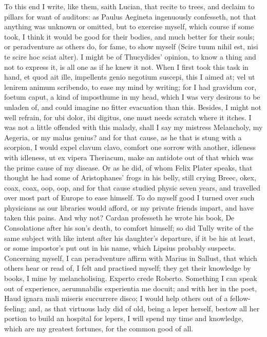{To this end I write, like them, saith Lucian, that recite to trees, and
declaim to pillars for want of auditors: as Paulus Aegineta
ingenuously confesseth, not that anything was unknown or omitted, but
to exercise myself, which course if some took, I think it would be good
for their bodies, and much better for their souls; or peradventure as
others do, for fame, to show myself (Scire tuum nihil est, nisi te
scire hoc sciat alter). I might be of Thucydides' opinion, to know
a thing and not to express it, is all one as if he knew it not. When I
first took this task in hand, et quod ait ille, impellents genio
negotium suscepi, this I aimed at; vel ut lenirem animum scribendo,
to ease my mind by writing; for I had gravidum cor, foetum caput, a
kind of imposthume in my head, which I was very desirous to be unladen
of, and could imagine no fitter evacuation than this. Besides, I might
not well refrain, for ubi dolor, ibi digitus, one must needs scratch
where it itches. I was not a little offended with this malady, shall I
say my mistress Melancholy, my Aegeria, or my malus genius? and for
that cause, as he that is stung with a scorpion, I would expel clavum
clavo, comfort one sorrow with another, idleness with idleness, ut
ex vipera Theriacum, make an antidote out of that which was the prime
cause of my disease. Or as he did, of whom Felix Plater speaks,
that thought he had some of Aristophanes' frogs in his belly, still
crying Breec, okex, coax, coax, oop, oop, and for that cause studied
physic seven years, and travelled over most part of Europe to ease
himself. To do myself good I turned over such physicians as our
libraries would afford, or my private friends impart, and have
taken this pains. And why not? Cardan professeth he wrote his book, De
Consolatione after his son's death, to comfort himself; so did Tully
write of the same subject with like intent after his daughter's
departure, if it be his at least, or some impostor's put out in his
name, which Lipsius probably suspects. Concerning myself, I can
peradventure affirm with Marius in Sallust, that which others hear
or read of, I felt and practised myself; they get their knowledge by
books, I mine by melancholising. Experto crede Roberto. Something I can
speak out of experience, aerumnabilis experientia me docuit; and with
her in the poet, Haud ignara mali miseris succurrere disco; I would
help others out of a fellow-feeling; and, as that virtuous lady did of
old, being a leper herself, bestow all her portion to build an
hospital for lepers, I will spend my time and knowledge, which are my
greatest fortunes, for the common good of all.

}
